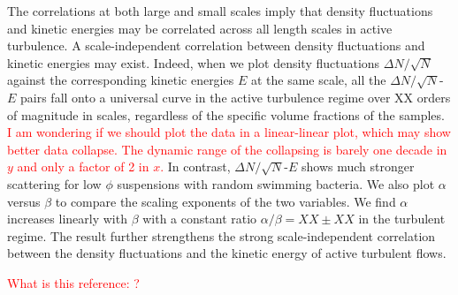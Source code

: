\documentclass[twocolumn,aps,prl,amsmath,amssymb,longbibliography]{revtex4-2}
\begin{document}
The correlations at both large and small scales imply that density fluctuations and kinetic energies may be correlated across all length scales in active turbulence. A scale-independent correlation between density fluctuations and kinetic energies may exist. Indeed, when we plot density fluctuations $\Delta N/\sqrt N$ against the corresponding kinetic energies $E$ at the same scale, all the $\Delta N/\sqrt N$-$E$ pairs fall onto a universal curve in the active turbulence regime over XX orders of magnitude in scales, regardless of the specific volume fractions of the samples. \textcolor{red}{I am wondering if we should plot the data in a linear-linear plot, which may show better data collapse. The dynamic range of the collapsing is barely one decade in $y$ and only a factor of 2 in $x$.} In contrast, $\Delta N/\sqrt N$-$E$ shows much stronger scattering for low $\phi$ suspensions with random swimming bacteria. We also plot $\alpha$ versus $\beta$ to compare the scaling exponents of the two variables. We find $\alpha$ increases linearly with $\beta$ with a constant ratio $\alpha/\beta = XX \pm XX$ in the turbulent regime. The result further strengthens the strong scale-independent correlation between the density fluctuations and the kinetic energy of active turbulent flows.

\textcolor{red}{What is this reference: \cite{Chatterjee2019}?}
\end{document}
